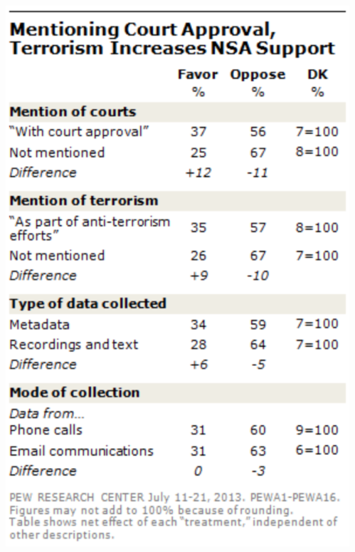 \documentclass[aspectratio=169]{beamer}
\theoremstyle{principle}
\begin{document}
\begin{frame}
\begin{columns}
\begin{column}{0.5\textwidth}
\end{column}
\begin{column}{0.5\textwidth}
\begin{center}
\includegraphics[scale=0.5]{pew_2.png}
\end{center}
\end{column}
\end{columns}

\end{frame}
\end{document}

